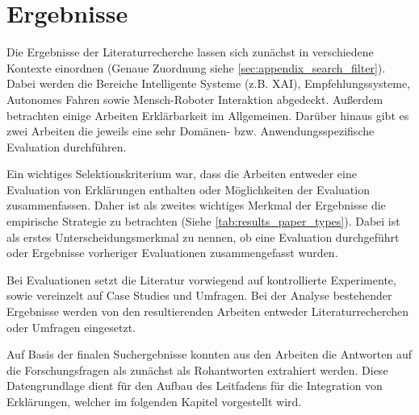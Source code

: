\newpage

\section{Ergebnisse}

Die Ergebnisse der Literaturrecherche lassen sich zunächst in verschiedene Kontexte einordnen (Genaue Zuordnung siehe \autoref{sec:appendix_search_filter}). Dabei werden die Bereiche Intelligente Systeme (z.B. XAI), Empfehlungssysteme, Autonomes Fahren sowie Mensch-Roboter Interaktion abgedeckt. Außerdem betrachten einige Arbeiten Erklärbarkeit im Allgemeinen. Darüber hinaus gibt es zwei Arbeiten die jeweils eine sehr Domänen- bzw. Anwendungsspezifische Evaluation durchführen.

Ein wichtiges Selektionskriterium war, dass die Arbeiten entweder eine Evaluation von Erklärungen enthalten oder Möglichkeiten der Evaluation zusammenfassen. Daher ist als zweites wichtiges Merkmal der Ergebnisse die empirische Strategie zu betrachten (Siehe \autoref{tab:results_paper_types}). Dabei ist als erstes Unterscheidungsmerkmal zu nennen, ob eine Evaluation durchgeführt oder Ergebnisse vorheriger Evaluationen zusammengefasst wurden.

Bei Evaluationen setzt die Literatur vorwiegend auf kontrollierte Experimente, sowie vereinzelt auf Case Studies und Umfragen. Bei der Analyse bestehender Ergebnisse werden von den resultierenden Arbeiten entweder Literaturrecherchen oder Umfragen eingesetzt.

Auf Basis der finalen Suchergebnisse konnten aus den Arbeiten die Antworten auf die Forschungsfragen als zunächst als Rohantworten extrahiert werden. Diese Datengrundlage dient für den Aufbau des Leitfadens für die Integration von Erklärungen, welcher im folgenden Kapitel vorgestellt wird.

